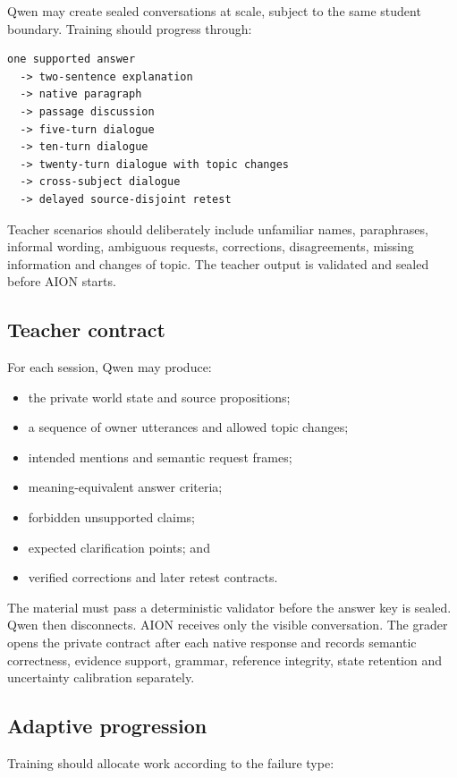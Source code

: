 \documentclass[11pt,a4paper]{article}
\begin{document}
Qwen may create sealed conversations at scale, subject to the same student boundary.  Training
should progress through:

\begin{lstlisting}
one supported answer
  -> two-sentence explanation
  -> native paragraph
  -> passage discussion
  -> five-turn dialogue
  -> ten-turn dialogue
  -> twenty-turn dialogue with topic changes
  -> cross-subject dialogue
  -> delayed source-disjoint retest
\end{lstlisting}

Teacher scenarios should deliberately include unfamiliar names, paraphrases, informal wording,
ambiguous requests, corrections, disagreements, missing information and changes of topic.  The
teacher output is validated and sealed before AION starts.

\subsection{Teacher contract}

For each session, Qwen may produce:

\begin{itemize}
  \item the private world state and source propositions;
  \item a sequence of owner utterances and allowed topic changes;
  \item intended mentions and semantic request frames;
  \item meaning-equivalent answer criteria;
  \item forbidden unsupported claims;
  \item expected clarification points; and
  \item verified corrections and later retest contracts.
\end{itemize}

The material must pass a deterministic validator before the answer key is sealed.  Qwen then
disconnects.  AION receives only the visible conversation.  The grader opens the private contract
after each native response and records semantic correctness, evidence support, grammar, reference
integrity, state retention and uncertainty calibration separately.

\subsection{Adaptive progression}

Training should allocate work according to the failure type:
\end{document}
